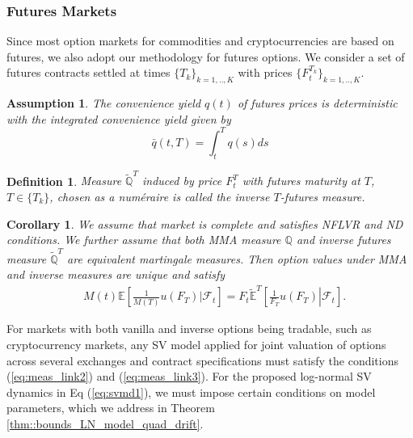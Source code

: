 \documentclass[pdftex,11pt,a4paper] {article}
\newtheorem{corollary}{Corollary}[section]
\newtheorem{definition}{Definition}[section]
\newtheorem{assumption}{Assumption}[section]
\begin{document}
\subsubsection{Futures Markets}

Since most option markets for commodities and cryptocurrencies are based on futures, we also adopt our methodology for futures options. We consider a set of futures contracts settled at times $\{T_{k}\}_{k=1,..,K}$ with prices $\{F^{T_{k}}_t\}_{k=1,..,K}$.

\begin{assumption}\label{a:r1} The convenience yield $q(t)$ of futures prices is deterministic with the integrated convenience yield given by
\begin{equation}\label{eq:r1}
\bar{q}(t, T) = \int^{T}_{t}q(s)ds
\end{equation}
\end{assumption}

\begin{definition}
Measure $\tilde{\mathbb{Q}}^{T}$ induced by price $F^{T}_t$ with futures maturity at $T$, $T\in\{T_{k}\}$, chosen as a num\'eraire is called the inverse $T$-futures measure.
\end{definition}


\begin{corollary}\label{def2} We assume that market is complete and satisfies NFLVR and ND conditions. We further assume that both MMA measure $\mathbb{Q}$ and inverse futures measure $\tilde{\mathbb{Q}}^{T}$ are equivalent martingale measures. Then option values under MMA and inverse measures are unique and satisfy
\begin{equation}\label{eq:meas_link3}
\begin{split}
& M(t)\mathbb{E}\left[\frac{1}{M(T)}\left.u(F_T)\right|\mathcal{F}_{t}\right]
=F_{t}\tilde{\mathbb{E}}^{T}\left[\left.\frac{1}{F_T}u(F_T)\right|\mathcal{F}_{t}\right].
\end{split}
\end{equation}

\end{corollary}


For markets with both vanilla and inverse options being tradable, such as cryptocurrency markets, any SV model applied for joint valuation of options across several exchanges and contract specifications must satisfy the conditions (\ref{eq:meas_link2}) and (\ref{eq:meas_link3}). For the proposed log-normal SV dynamics in Eq (\ref{eq:svmd1}), we must impose certain conditions on model parameters, which we address in Theorem \ref{thm::bounds_LN_model_quad_drift}.
\end{document}
